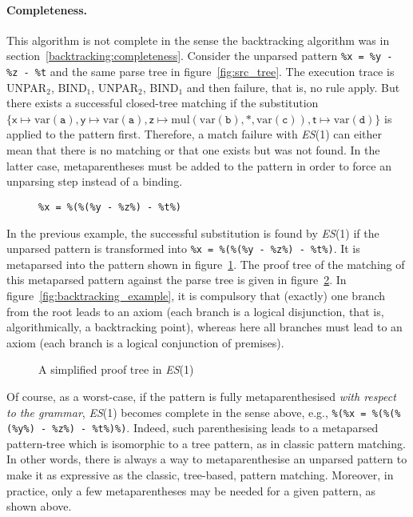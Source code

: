 \paragraph{Completeness.} This algorithm is not complete in the sense
the backtracking algorithm was in
section~\ref{backtracking:completeness}. Consider the unparsed pattern
\texttt{\%x = \%y - \%z - \%t} and the same parse tree in
figure~\ref{fig:src_tree}. The execution trace is
\textsf{UNPAR}\(_2\), \textsf{BIND}\(_1\), \textsf{UNPAR}\(_2\),
\textsf{BIND}\(_1\) and then failure, that is, no rule apply. But
there exists a successful closed\hyp{}tree matching if the
substitution \(\{\textsf{x} \mapsto \text{var}(\texttt{a}), \textsf{y}
\mapsto \text{var}(\texttt{a}), \textsf{z} \mapsto
\text{mul}(\text{var}(\texttt{b}), \texttt{*},
\text{var}(\texttt{c})), \textsf{t} \mapsto \text{var}(\texttt{d})\}\)
is applied to the pattern first. Therefore, a match failure with
\textit{ES}(1) can either mean that there is no matching or that one
exists but was not found. In the latter case, meta\-parentheses must
be added to the pattern in order to force an unparsing step instead of
a binding.
\begin{figure}[b]
\caption{\texttt{\%x = \%(\%(\%y - \%z\%) - \%t\%)}\label{fig:meta}}
\end{figure}
In the previous example, the successful substitution is found by
\textit{ES}(1) if the unparsed pattern is transformed into \texttt{\%x
= \%(\%(\%y - \%z\%) - \%t\%)}. It is meta\-parsed into the pattern
shown in figure~\ref{fig:meta}. The proof tree of the matching of this
meta\-parsed pattern against the parse tree is given in
figure~\ref{fig:trace_es1}. In figure~\ref{fig:backtracking_example},
it is compulsory that (exactly) one branch from the root leads to an
axiom (each branch is a logical disjunction, that is, algorithmically,
a backtracking point), whereas here all branches must lead to an axiom
(each branch is a logical conjunction of premises).
\begin{figure}[t]
\caption{A simplified proof tree in \textit{ES}(1)\label{fig:trace_es1}}
\end{figure}

Of course, as a worst\hyp{}case, if the pattern is fully
meta\-parenthesised \emph{with respect to the grammar}, \textit{ES}(1)
becomes complete in the sense above, e.g., \texttt{\%(\%x =
\%(\%(\%(\%y\%) - \%z\%) - \%t\%)\%)}. Indeed, such parenthesising
leads to a meta\-parsed pattern\hyp{}tree which is isomorphic to a
tree pattern, as in classic pattern matching. In other words, there is
always a way to meta\-parenthesise an unparsed pattern to make it as
expressive as the classic, tree\hyp{}based, pattern
matching. Moreover, in practice, only a few meta\-parentheses may be
needed for a given pattern, as shown above.

